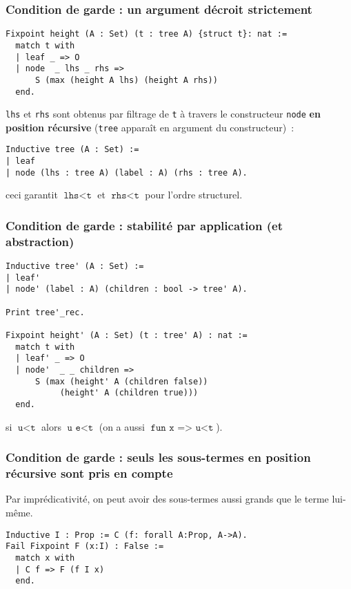 \documentclass{beamer}
\begin{document}
\begin{frame}[fragile]
  \frametitle{Condition de garde : un argument décroit strictement}

\begin{verbatim}
Fixpoint height (A : Set) (t : tree A) {struct t}: nat :=
  match t with
  | leaf _ => O
  | node  _ lhs _ rhs =>
      S (max (height A lhs) (height A rhs))
  end.
\end{verbatim}

\texttt{lhs} et \texttt{rhs} sont obtenus par filtrage de
\texttt{t} à travers le constructeur \texttt{node}
\textbf{en position récursive} (\texttt{tree} apparaît en argument
du constructeur) :

\begin{verbatim}
Inductive tree (A : Set) :=
| leaf
| node (lhs : tree A) (label : A) (rhs : tree A).
\end{verbatim}

ceci garantit \(\texttt{lhs} < \texttt{t}\)
et \(\texttt{rhs} < \texttt{t}\)
pour l'ordre structurel.
\end{frame}
\begin{frame}[fragile]
  \frametitle{Condition de garde : stabilité par application (et abstraction)}

\begin{verbatim}
Inductive tree' (A : Set) :=
| leaf'
| node' (label : A) (children : bool -> tree' A).

Print tree'_rec.

Fixpoint height' (A : Set) (t : tree' A) : nat :=
  match t with
  | leaf' _ => O
  | node'  _ _ children =>
      S (max (height' A (children false))
           (height' A (children true)))
  end.
\end{verbatim}

si \(\texttt{u} < \texttt{t}\) alors
\(\texttt{u e} < \texttt{t}\)
(on a aussi \(\texttt{fun x => u} < \texttt{t}\)).

\end{frame}
\begin{frame}[fragile]
  \frametitle{Condition de garde : seuls les sous-termes en position récursive sont pris en compte}

  Par imprédicativité, on peut avoir des sous-termes aussi grands que le terme lui-même.

\begin{verbatim}
Inductive I : Prop := C (f: forall A:Prop, A->A).
Fail Fixpoint F (x:I) : False :=
  match x with
  | C f => F (f I x)
  end.
\end{verbatim}
\end{frame}
\end{document}
